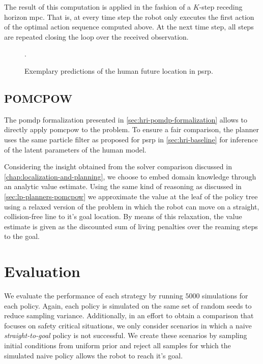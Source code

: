 The result of this computation is applied in the fashion of a $K$-step receding
horizon \ac{mpc}. That is, at every time step the robot only executes the first
action of the optimal action sequence computed above. At the next time step,
all steps are repeated closing the loop over the received observation.


\begin{figure}[htpb]
  \centering
  .
  \caption{Exemplary predictions of the human future location in \acf{psrp}.}
  \label{fig:psrp-prediction-example}
\end{figure}

\subsection{POMCPOW}\label{sec:hri-planners}

The \ac{pomdp} formalization presented in \cref{sec:hri-pomdp-formalization}
allows to directly apply \ac{pomcpow} to the problem. To ensure a fair
comparison, the planner uses the same particle filter as proposed for \ac{psrp}
in \cref{sec:hri-baseline} for inference of the latent parameters of the human model.

Considering the insight obtained from the solver comparison discussed in
\cref{chap:localization-and-planning}, we choose to embed domain knowledge
through an analytic value estimate. Using the same kind of reasoning as
discussed in \cref{sec:lp-planners-pomcpow} we approximate the value at the
leaf of the policy tree using a relaxed version of the problem in which the
robot can move on a straight, collision-free line to it's goal location. By
means of this relaxation, the value estimate is given as the discounted sum of
living penalties over the reaming steps to the goal.

\section{Evaluation}\label{sec:hri-evaluation}

We evaluate the performance of each strategy by running $5000$ simulations for
each policy. Again, each policy is simulated on the same set of random seeds to
reduce sampling variance. Additionally, in an effort to obtain a comparison
that focuses on safety critical situations, we only consider scenarios in which
a naive \emph{straight-to-goal} policy is not successful. We create these
scenarios by sampling initial conditions from uniform prior and reject all
samples for which the simulated naive policy allows the robot to reach it's goal.

